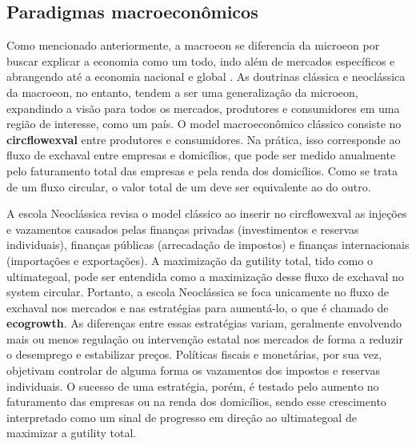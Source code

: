 \documentclass[./main.tex]{subfiles}
\begin{document}
\subsection{Paradigmas macroeconômicos} \label{subsec:macroeco}

\par Como mencionado anteriormente, a \gls{macroeon} se diferencia da \gls{microeon} por buscar explicar a economia como um todo, indo além de mercados específicos e abrangendo até a economia nacional e global \cite{samuelson2009}. As doutrinas clássica e neoclássica da \gls{macroeon}, no entanto, tendem a ser uma generalização da \gls{microeon}, expandindo a visão para todos os mercados, produtores e consumidores em uma região de interesse, como um país. O \gls{model} macroeconômico clássico consiste no \textbf{\gls{circflowexval}} entre produtores e consumidores. Na prática, isso corresponde ao fluxo de \gls{exchaval} entre empresas e domicílios, que pode ser medido anualmente pelo faturamento total das empresas e pela renda dos domicílios. Como se trata de um fluxo circular, o valor total de um deve ser equivalente ao do outro. 

\par A escola Neoclássica revisa o \gls{model} clássico ao inserir no \gls{circflowexval} as injeções e vazamentos causados pelas finanças privadas (investimentos e reservas individuais), finanças públicas (arrecadação de impostos) e finanças internacionais (importações e exportações). A maximização da \gls{gutility} total, tido como o \gls{ultimategoal}, pode ser entendida como a maximização desse fluxo de \gls{exchaval} no \gls{system} circular. Portanto, a escola Neoclássica se foca unicamente no fluxo de \gls{exchaval} nos mercados e nas estratégias para aumentá-lo, o que é chamado de \textbf{\gls{ecogrowth}}. As diferenças entre essas estratégias variam, geralmente envolvendo mais ou menos regulação ou intervenção estatal nos mercados de forma a reduzir o desemprego e estabilizar preços. Políticas fiscais e monetárias, por sua vez, objetivam controlar de alguma forma os vazamentos dos impostos e reservas individuais. O sucesso de uma estratégia, porém, é testado pelo aumento no faturamento das empresas ou na renda dos domicílios, sendo esse crescimento interpretado como um sinal de progresso em direção ao \gls{ultimategoal} de maximizar a \gls{gutility} total.
\end{document}
